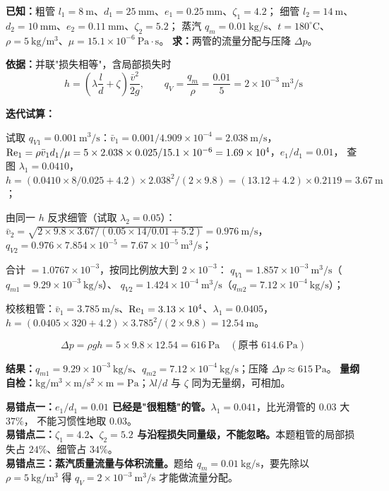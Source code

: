 \begin{jie}
\textbf{已知：}粗管 $l_1=8\ \mathrm{m}$、$d_1=25\ \mathrm{mm}$、$e_1=0.25\ \mathrm{mm}$、$\zeta_1=4.2$；
细管 $l_2=14\ \mathrm{m}$、$d_2=10\ \mathrm{mm}$、$e_2=0.11\ \mathrm{mm}$、$\zeta_2=5.2$；
蒸汽 $q_m=0.01\ \mathrm{kg/s}$、$t=180^\circ\mathrm{C}$、$\rho=5\ \mathrm{kg/m^3}$、$\mu=15.1\times10^{-6}\ \mathrm{Pa\cdot s}$。
\textbf{求：}两管的流量分配与压降 $\Delta p$。

\textbf{依据：}并联"损失相等"，含局部损失时
\[ h=\left(\lambda\frac ld+\zeta\right)\frac{\bar v^2}{2g},\qquad q_V=\frac{q_m}{\rho}=\frac{0.01}{5}=2\times10^{-3}\ \mathrm{m^3/s} \]

\textbf{迭代试算：}
\begin{xiaowen}
\item 试取 $q_{V1}=0.001\ \mathrm{m^3/s}$：$\bar v_1=0.001/4.909\times10^{-4}=2.038\ \mathrm{m/s}$，
$\mathrm{Re}_1=\rho\bar v_1d_1/\mu=5\times2.038\times0.025/15.1\times10^{-6}=1.69\times10^4$，$e_1/d_1=0.01$，
查图 $\lambda_1=0.0410$，
$h=(0.0410\times8/0.025+4.2)\times2.038^2/(2\times9.8)=(13.12+4.2)\times0.2119=3.67\ \mathrm{m}$；
\item 由同一 $h$ 反求细管（试取 $\lambda_2=0.05$）：
$\bar v_2=\sqrt{2\times9.8\times3.67/(0.05\times14/0.01+5.2)}=0.976\ \mathrm{m/s}$，
$q_{V2}=0.976\times7.854\times10^{-5}=7.67\times10^{-5}\ \mathrm{m^3/s}$；
\item 合计 $=1.0767\times10^{-3}$，按同比例放大到 $2\times10^{-3}$：
$q_{V1}=1.857\times10^{-3}\ \mathrm{m^3/s}$（$q_{m1}=9.29\times10^{-3}\ \mathrm{kg/s}$）、
$q_{V2}=1.424\times10^{-4}\ \mathrm{m^3/s}$（$q_{m2}=7.12\times10^{-4}\ \mathrm{kg/s}$）；
\item 校核粗管：$\bar v_1=3.785\ \mathrm{m/s}$、$\mathrm{Re}_1=3.13\times10^4$、$\lambda_1=0.0405$，
$h=(0.0405\times320+4.2)\times3.785^2/(2\times9.8)=12.54\ \mathrm{m}$。
\end{xiaowen}
\[ \Delta p=\rho gh=5\times9.8\times12.54=616\ \mathrm{Pa}\quad(\text{原书 }614.6\ \mathrm{Pa}) \]

\textbf{结果：}$q_{m1}=9.29\times10^{-3}\ \mathrm{kg/s}$、$q_{m2}=7.12\times10^{-4}\ \mathrm{kg/s}$；压降 $\Delta p\approx615\ \mathrm{Pa}$。
\textbf{量纲自检：}$\mathrm{kg/m^3\times m/s^2\times m}=\mathrm{Pa}$；$\lambda l/d$ 与 $\zeta$ 同为无量纲，可相加。
\end{jie}

\begin{yicuo}
\textbf{易错点一：$e_1/d_1=0.01$ 已经是"很粗糙"的管。}$\lambda_1=0.041$，比光滑管的 $0.03$ 大 $37\%$，
不能习惯性地取 $0.03$。\\
\textbf{易错点二：$\zeta_1=4.2$、$\zeta_2=5.2$ 与沿程损失同量级，不能忽略。}本题粗管的局部损失占 $24\%$、细管占 $34\%$。\\
\textbf{易错点三：蒸汽质量流量与体积流量。}题给 $q_m=0.01\ \mathrm{kg/s}$，要先除以 $\rho=5\ \mathrm{kg/m^3}$
得 $q_V=2\times10^{-3}\ \mathrm{m^3/s}$ 才能做流量分配。
\end{yicuo}

